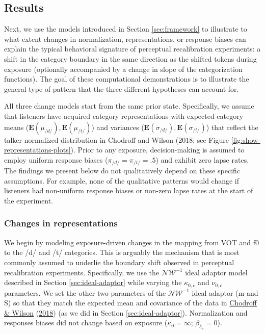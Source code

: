 \documentclass[
  11pt,
  english,
  man,floatsintext]{apa6}
\begin{document}
\hypertarget{results}{%
\subsection{Results}\label{results}}

Next, we use the models introduced in Section \ref{sec:framework} to illustrate to what extent changes in normalization, representations, or response biases can explain the typical behavioral signature of perceptual recalibration experiments: a shift in the category boundary in the same direction as the shifted tokens during exposure (optionally accompanied by a change in slope of the categorization functions). The goal of these computational demonstrations is to illustrate the general type of pattern that the three different hypotheses can account for.

All three change models start from the same prior state. Specifically, we assume that listeners have acquired category representations with expected category means (\(\mathbf{E}(\mu_{/d/}), \mathbf{E}(\mu_{/t/})\)) and variances (\(\mathbf{E}(\sigma_{/d/}), \mathbf{E}(\sigma_{/t/})\)) that reflect the talker-normalized distribution in Chodroff and Wilson (2018; see Figure \ref{fig:show-representations-plots}). Prior to any exposure, decision-making is assumed to employ uniform response biases (\(\pi_{/d/}=\pi_{/t/}=.5\)) and exhibit zero lapse rates. The findings we present below do not qualitatively depend on these specific assumptions. For example, none of the qualitative patterns would change if listeners had non-uniform response biases or non-zero lapse rates at the start of the experiment.

\hypertarget{changes-in-representations}{%
\subsubsection{Changes in representations}\label{changes-in-representations}}

We begin by modeling exposure-driven changes in the mapping from VOT and f0 to the /d/ and /t/ categories. This is arguably the mechanism that is most commonly assumed to underlie the boundary shift observed in perceptual recalibration experiments. Specifically, we use the \(\mathcal{NW}^{-1}\) ideal adaptor model described in Section \ref{sec:ideal-adaptor} while varying the \(\kappa_{0,c}\) and \(\nu_{0,c}\) parameters. We set the other two parameters of the \(\mathcal{NW}^{-1}\) ideal adaptor (\(\mathrm{m}\) and \(\mathrm{S}\)) so that they match the expected mean and covariance of the data in \protect\hyperlink{ref-chodroff-wilson2018}{Chodroff \& Wilson} (\protect\hyperlink{ref-chodroff-wilson2018}{2018}) (as we did in Section \ref{sec:ideal-adaptor}). Normalization and responses biases did not change based on exposure (\(\kappa_0 = \infty\); \(\beta_{\delta_\pi}=0\)).
\end{document}
